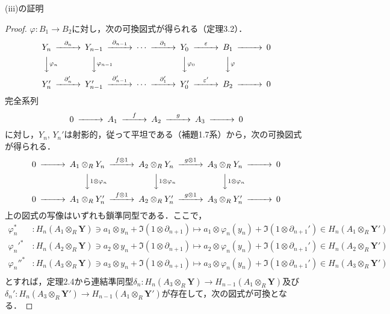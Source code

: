 \begin{screen}
  (iii)の証明
\end{screen}
\begin{proof}
  $\varphi \colon B_1 \to B_2$に対し，次の可換図式が得られる（定理3.2）．
  \[
  \begin{CD}
    Y_n @>{\partial_n}>> Y_{n-1} @>{\partial_{n-1}}>> \cdots @>{\partial_1}>> Y_0 @>{\varepsilon}>> B_1 @>>> 0 \\
    @VV{\varphi_n}V @VV{\varphi_{n-1}}V @. @VV{\varphi_0}V @VV{\varphi}V \\
    Y_n' @>{\partial_n'}>> Y_{n-1}' @>{\partial_{n-1}'}>> \cdots @>{\partial_1'}>> Y_0' @>{\varepsilon'}>> B_2 @>>> 0
  \end{CD}
  \]
  完全系列
  \[
  \begin{CD}
    0 @>>> A_1 @>{f}>> A_2 @>{g}>> A_3 @>>> 0
  \end{CD}
  \]
  に対し，$Y_n$, $Y_n'$は射影的，従って平坦である（補題1.7系）から，次の可換図式が得られる．
  \[
  \begin{CD}
    0 @>>> A_1 \otimes_R Y_n @>{f \otimes 1}>> A_2 \otimes_R Y_n @>{g \otimes 1}>> A_3 \otimes_R Y_n @>>> 0 \\
    @. @VV{1 \otimes \varphi_n}V @VV{1 \otimes \varphi_n}V @VV{1 \otimes \varphi_n}V \\
    0 @>>> A_1 \otimes_R Y_n' @>{f \otimes 1}>> A_2 \otimes_R Y_n' @>{g \otimes 1}>> A_3 \otimes_R Y_n' @>>> 0
  \end{CD}
  \]
  上の図式の写像はいずれも鎖準同型である．ここで，
  \begin{align*}
    \varphi_n^{\ast} & \colon H_n(A_1 \otimes_R \boldsymbol{Y}) \ni a_1 \otimes y_n + \Im (1 \otimes \partial_{n+1}) \mapsto a_1 \otimes \varphi_n(y_n) + \Im (1 \otimes \partial_{n+1}') \in H_n(A_1 \otimes_R \boldsymbol{Y}') \\
    \varphi_n'^{\ast} & \colon H_n(A_2 \otimes_R \boldsymbol{Y}) \ni a_2 \otimes y_n + \Im (1 \otimes \partial_{n+1}) \mapsto a_2 \otimes \varphi_n(y_n) + \Im (1 \otimes \partial_{n+1}') \in H_n(A_2 \otimes_R \boldsymbol{Y}') \\
    \varphi_n''^{\ast} & \colon H_n(A_3 \otimes_R \boldsymbol{Y}) \ni a_3 \otimes y_n + \Im (1 \otimes \partial_{n+1}) \mapsto a_3 \otimes \varphi_n(y_n) + \Im (1 \otimes \partial_{n+1}') \in H_n(A_3 \otimes_R \boldsymbol{Y}') \\
  \end{align*}
  とすれば，定理2.4から連結準同型$\delta_n \colon H_n(A_3 \otimes_R \boldsymbol{Y}) \to H_{n-1}(A_1 \otimes_R \boldsymbol{Y})$及び$\delta_n' \colon H_n(A_3 \otimes_R \boldsymbol{Y}') \to H_{n-1}(A_1 \otimes_R \boldsymbol{Y}')$が存在して，次の図式が可換となる．

\end{proof}

